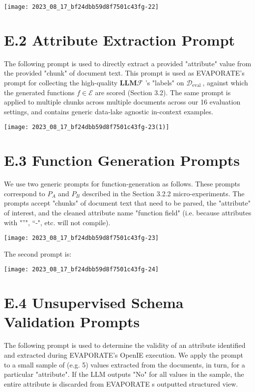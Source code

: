 \documentclass[10pt]{article}
\begin{document}
\begin{center}
\texttt{[image: 2023\_08\_17\_bf24dbb59d8f7501c43fg-22]}
\end{center}

\section{E.2 Attribute Extraction Prompt}
The following prompt is used to directly extract a provided "attribute" value from the provided "chunk" of document text. This prompt is used as EVAPORATE's prompt for collecting the high-quality $\mathbf{L} \mathbf{L} \mathbf{M} \mathcal{F}$ 's "labels" on $\mathcal{D}_{\text {eval }}$, against which the generated functions $f \in \mathcal{E}$ are scored (Section 3.2). The same prompt is applied to multiple chunks across multiple documents across our 16 evaluation settings, and contains generic data-lake agnostic in-context examples.

\begin{center}
\texttt{[image: 2023\_08\_17\_bf24dbb59d8f7501c43fg-23(1)]}
\end{center}

\section{E.3 Function Generation Prompts}
We use two generic prompts for function-generation as follows. These prompts correspond to $P_{A}$ and $P_{B}$ described in the Section 3.2.2 micro-experiments. The prompts accept "chunks" of document text that need to be parsed, the "attribute" of interest, and the cleaned attribute name "function field" (i.e. because attributes with "”", “-", etc. will not compile).

\begin{center}
\texttt{[image: 2023\_08\_17\_bf24dbb59d8f7501c43fg-23]}
\end{center}

The second prompt is:

\begin{center}
\texttt{[image: 2023\_08\_17\_bf24dbb59d8f7501c43fg-24]}
\end{center}

\section{E.4 Unsupervised Schema Validation Prompts}
The following prompt is used to determine the validity of an attribute identified and extracted during EVAPORATE's OpenIE execution. We apply the prompt to a small sample of (e.g. 5) values extracted from the documents, in turn, for a particular "attribute". If the LLM outputs "No" for all values in the sample, the entire attribute is discarded from EVAPORATE s outputted structured view.
\end{document}
